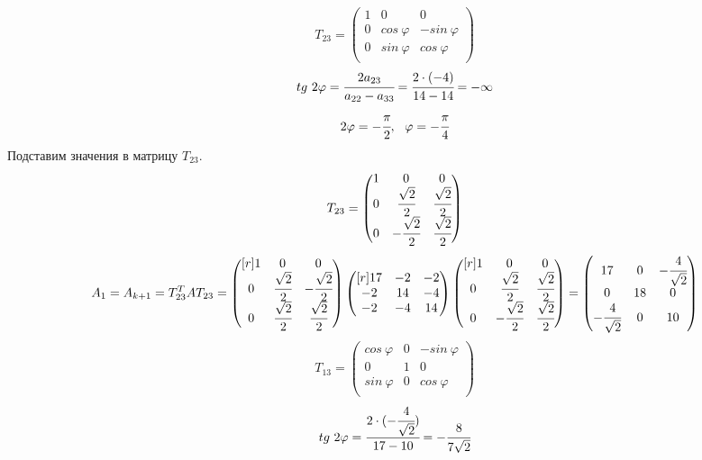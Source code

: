 \documentclass[12pt]{article}
\theoremstyle{definition}
\numberwithin{equation}{section}
\begin{document}
	\[T_{23} = \begin{pmatrix}
	1 & 0 & 0\\
	0 & cos ~\varphi & -sin ~\varphi\\
	0 & sin ~\varphi & cos ~\varphi\\
	\end{pmatrix}\]
	$$tg ~2\varphi =\cfrac{2 a_{23}}{a_{22}-a_{33}}=\cfrac{2\cdot (-4)}{14-14}=-\infty$$
	$$2\varphi =-\cfrac{\pi}{2},~~\varphi=-\cfrac{\pi}{4}$$
	Подставим значения в матрицу $T_{23}$.
	\[T_{23} = \begin{pmatrix}
	1 & 0 & 0\\
	0 & \cfrac{\sqrt{2}}{2} & \cfrac{\sqrt{2}}{2}\\
	0 & -\cfrac{\sqrt{2}}{2} & \cfrac{\sqrt{2}}{2}\\
	\end{pmatrix}\]
	\[A_1=A_{k+1} = T_{23}^T A T_{23}=\begin{pmatrix}[r]
	1 & 0 & 0\\
	0 & \cfrac{\sqrt{2}}{2} & -\cfrac{\sqrt{2}}{2}\\
	0 & \cfrac{\sqrt{2}}{2} & \cfrac{\sqrt{2}}{2}\\
	\end{pmatrix} \begin{pmatrix}[r]
	17 & -2 & -2\\
	-2 & 14 & -4\\
	-2 & -4 & 14\\
	\end{pmatrix} \begin{pmatrix}[r]
	1 & 0 & 0\\
	0 & \cfrac{\sqrt{2}}{2} & \cfrac{\sqrt{2}}{2}\\
	0 & -\cfrac{\sqrt{2}}{2} & \cfrac{\sqrt{2}}{2}\\
	\end{pmatrix}=\begin{pmatrix}
	17 & 0 & -\cfrac{4}{\sqrt{2}}\\
	0 & 18 & 0\\
	-\cfrac{4}{\sqrt{2}} & 0 & 10\\
	\end{pmatrix}\]
	\[T_{13} = \begin{pmatrix}
	cos ~\varphi & 0 & -sin ~\varphi\\
	0 & 1 & 0\\
	sin ~\varphi & 0 & cos ~\varphi\\
	\end{pmatrix}\]
	$$tg ~2\varphi=\cfrac{2\cdot (-\cfrac{4}{\sqrt{2}})}{17-10}=-\cfrac{8}{7\sqrt{2}}$$
\end{document}
